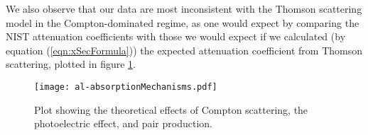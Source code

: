 \documentclass[letter]{article}
\begin{document}
We also observe that our data are most inconsistent with the Thomson scattering model in the Compton-dominated regime, as one would expect by comparing the NIST attenuation coefficients with those we would expect if we calculated (by equation (\ref{eqn:xSecFormula})) the expected attenuation coefficient from Thomson scattering, plotted in figure \ref{fig:AttenComp}.


\begin{figure}[p] \centering
    \texttt{[image: al-absorptionMechanisms.pdf]}
    \caption{Plot showing the theoretical effects of Compton scattering, the photoelectric effect, and pair production.}
    \label{fig:AttenComp}
\end{figure}
\end{document}

